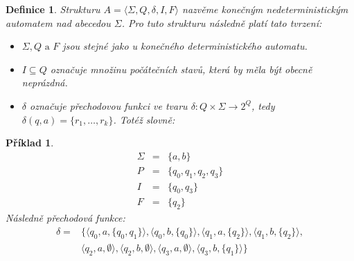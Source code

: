 \documentclass[10pt,a4paper]{article}
\theoremstyle{note}
\newtheorem{definice}{Definice}
\newtheorem{priklad}{Příklad}
\begin{document}
\begin{definice}
Strukturu $A = \langle \Sigma, Q, \delta, I, F \rangle$ nazvěme \textit{konečným nedeterministickým automatem} nad abecedou $\Sigma$. Pro tuto strukturu následně platí tato tvrzení:
\begin{itemize}
\item
$\Sigma, Q \text{ a } F$ jsou stejné jako u konečného deterministického automatu.
\item
$I\subseteq Q$ označuje množinu počátečních stavů, která by měla být obecně neprázdná.
\item
$\delta$ označuje přechodovou funkci ve tvaru $\delta : Q \times \Sigma \rightarrow 2^{Q}$, tedy $\delta (q, a) = \lbrace r_{1}, \ldots, r_{k} \rbrace$. Totéž slovně: 
\end{itemize}
\end{definice}

\begin{priklad}\label{priklad-3}
\begin{eqnarray*}
\Sigma &=& \lbrace a, b \rbrace \\
P &=& \lbrace q_{0}, q_{1}, q_{2}, q_{3} \rbrace \\
I &=& \lbrace q_{0}, q_{3} \rbrace \\
F &=& \lbrace q_{2} \rbrace 
\end{eqnarray*}
Následně přechodová funkce:
\begin{eqnarray*}
\delta =&
\lbrace
\langle q_{0}, a, \lbrace q_{0},q_{1} \rbrace \rangle,
\langle q_{0}, b, \lbrace q_{0} \rbrace \rangle,
\langle q_{1}, a, \lbrace q_{2} \rbrace \rangle,
\langle q_{1}, b, \lbrace q_{2} \rbrace \rangle, \\
& \langle q_{2}, a, \emptyset \rangle,
\langle q_{2}, b, \emptyset \rangle,
\langle q_{3}, a, \emptyset \rangle,
\langle q_{3}, b, \lbrace q_{1} \rbrace \rangle 
\rbrace
\end{eqnarray*}
\end{priklad}
\end{document}
